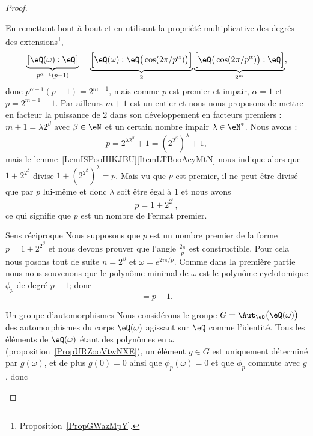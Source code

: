 \begin{proof}
\begin{subproof}
            En remettant bout à bout et en utilisant la propriété multiplicative des degrés des extensions\footnote{Proposition~\ref{PropGWazMpY}.},
            \begin{equation}
                \underbrace{\big[ \eQ(\omega):\eQ \big]}_{p^{\alpha-1}(p-1)}=\underbrace{\Big[ \eQ(\omega):\eQ\big( \cos(2\pi/p^{\alpha}) \big) \Big]}_{2}\underbrace{\Big[ \eQ\big( \cos(2\pi/p^{\alpha}) \big):\eQ \Big]}_{2^m},
            \end{equation}
            donc \( p^{\alpha-1}(p-1)=2^{m+1}\), mais comme \( p\) est premier et impair, \( \alpha=1\) et \( p=2^{m+1}+1\). Par ailleurs \( m+1\) est un entier et nous nous proposons de mettre en facteur la puissance de \( 2\) dans son développement en facteurs premiers : \( m+1=\lambda 2^{\beta}\) avec \( \beta\in \eN\) et un certain nombre impair \( \lambda\in \eN^*\). Nous avons :
            \begin{equation}
                p=2^{\lambda 2^{\beta}}+1=\left( 2^{2^{\beta}} \right)^{\lambda}+1,
            \end{equation}
            mais le lemme~\ref{LemISPooHIKJBU}\ref{ItemLTBooAcyMtN} nous indique alors que \( 1+2^{2^{\beta}}\) divise \( 1+\left( 2^{2^{\beta}} \right)^{\lambda}=p\). Mais vu que \( p\) est premier, il ne peut être divisé que par \( p\) lui-même et donc \( \lambda\) soit être égal à \( 1\) et nous avons
            \begin{equation}
                p=1+2^{2^{\beta}},
            \end{equation}
            ce qui signifie que \( p\) est un nombre de Fermat premier.
        \item[Sens réciproque]
            Nous supposons que \( p\) est un nombre premier de la forme \( p=1+2^{2^{\beta}}\) et nous devons prouver que l'angle \( \frac{ 2\pi }{ p }\) est constructible. Pour cela nous posons tout de suite \( n=2^{\beta}\) et \( \omega= e^{2i\pi/p}\). Comme dans la première partie nous nous souvenons que le polynôme minimal de \( \omega\) est le polynôme cyclotomique \( \phi_p\) de degré \( p-1\); donc
            \begin{equation}
                [\eQ(\omega):\eQ]=p-1.
            \end{equation}
            \begin{subproof}
                \item[Un groupe d'automorphismes]
                    Nous considérons le groupe \( G=\Aut_{\eQ}\big( \eQ(\omega) \big)\) des automorphismes du corps \( \eQ(\omega)\) agissant sur \( \eQ\) comme l'identité. Tous les éléments de \( \eQ(\omega)\) étant des polynômes en \( \omega\) (proposition~\ref{PropURZooVtwNXE}), un élément \( g\in G\) est uniquement déterminé par \( g(\omega)\), et de plus \( g(0)=0\) ainsi que \( \phi_p(\omega)=0\) et que \( \phi_p\) commute avec \( g\), donc

\end{subproof}
\end{subproof}
\end{proof}
